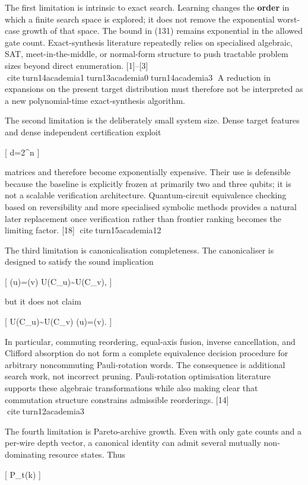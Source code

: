 \documentclass[
]{article}
\begin{document}
The first limitation is intrinsic to exact search. Learning changes the
\textbf{order} in which a finite search space is explored; it does not
remove the exponential worst-case growth of that space. The bound in
(131) remains exponential in the allowed gate count. Exact-synthesis
literature repeatedly relies on specialised algebraic, SAT,
meet-in-the-middle, or normal-form structure to push tractable problem
sizes beyond direct enumeration. {[}1{]}--{[}3{]}
citeturn14academia1turn13academia0turn14academia3 A reduction in
expansions on the present target distribution must therefore not be
interpreted as a new polynomial-time exact-synthesis algorithm.

The second limitation is the deliberately small system size. Dense
target features and dense independent certification exploit

{[} d=2\^{}n {]}

matrices and therefore become exponentially expensive. Their use is
defensible because the baseline is explicitly frozen at primarily two
and three qubits; it is not a scalable verification architecture.
Quantum-circuit equivalence checking based on reversibility and more
specialised symbolic methods provides a natural later replacement once
verification rather than frontier ranking becomes the limiting factor.
{[}18{]} citeturn15academia12

The third limitation is canonicalisation completeness. The canonicaliser
is designed to satisfy the sound implication

{[} \kappa(u)=\kappa(v) \Longrightarrow U(C\_u)\sim U(C\_v), {]}

but it does not claim

{[} U(C\_u)\sim U(C\_v) \Longrightarrow \kappa(u)=\kappa(v). {]}

In particular, commuting reordering, equal-axis fusion, inverse
cancellation, and Clifford absorption do not form a complete equivalence
decision procedure for arbitrary noncommuting Pauli-rotation words. The
consequence is additional search work, not incorrect pruning.
Pauli-rotation optimisation literature supports these algebraic
transformations while also making clear that commutation structure
constrains admissible reorderings. {[}14{]} citeturn12academia3

The fourth limitation is Pareto-archive growth. Even with only gate
counts and a per-wire depth vector, a canonical identity can admit
several mutually non-dominating resource states. Thus

{[} \textbar{}\mathcal P\_t(k)\textbar{} {]}
\end{document}
